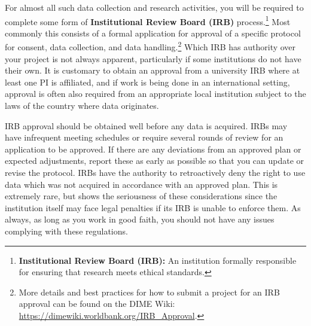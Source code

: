 \documentclass[
]{book}
\begin{document}
For almost all such data collection and research activities,
you will be required to complete some form of \textbf{Institutional Review Board (IRB)} process.\footnote{\textbf{Institutional Review Board (IRB):} An institution formally responsible for ensuring that research meets ethical standards.}
Most commonly this consists of a formal application for approval of a specific
protocol for consent, data collection, and data handling.\footnote{More details and best practices for how to submit a project for an IRB approval
  can be found on the DIME Wiki:
  \url{https://dimewiki.worldbank.org/IRB_Approval}.}
Which IRB has authority over your project is not always apparent,
particularly if some institutions do not have their own.
It is customary to obtain an approval from a university IRB
where at least one PI is affiliated,
and if work is being done in an international setting,
approval is often also required
from an appropriate local institution subject to the laws of the country where data originates.

IRB approval should be obtained well before any data is acquired.
IRBs may have infrequent meeting schedules
or require several rounds of review for an application to be approved.
If there are any deviations from an approved plan or expected adjustments,
report these as early as possible so that you can update or revise the protocol.
IRBs have the authority to retroactively deny
the right to use data which was not acquired in accordance with an approved plan.
This is extremely rare, but shows the seriousness of these considerations
since the institution itself may face legal penalties if its IRB
is unable to enforce them. As always, as long as you work in good faith,
you should not have any issues complying with these regulations.
\end{document}
